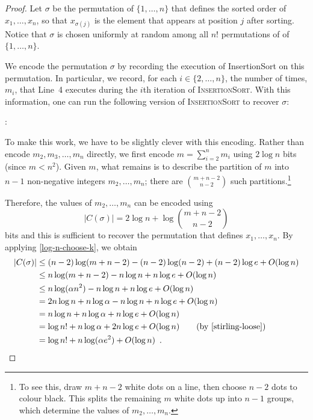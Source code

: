 \documentclass{patmorin}
\begin{document}
\begin{proof}
  Let $\sigma$ be the permutation of $\{1,\ldots,n\}$ that defines the
  sorted order of $x_1,\ldots,x_n$, so that $x_{\sigma(j)}$ is the
  element that appears at position $j$ after sorting. Notice that
  $\sigma$ is chosen uniformly at random among all $n!$ permutations
  of of $\{1,\ldots,n\}$.
  
  We encode the permutation $\sigma$ by recording the execution of
  InsertionSort on this permutation. In particular, we record, for
  each $i\in\{2,\ldots,n\}$, the number of times, $m_i$, that Line~4
  executes during the $i$th iteration of \textsc{InsertionSort}. With
  this information, one can run the following version of
  \textsc{InsertionSort} to recover $\sigma$:
  
  :
  \begin{algorithmic}[1]
       \ENDFOR
    \ENDFOR
  \end{algorithmic}
   
  To make this work, we have to be slightly clever with this
  encoding. Rather than encode $m_2,m_3,\ldots,m_n$ directly, we first
  encode $m=\sum_{i=2}^{n} m_i$ using $2\log n$ bits (since
  $m < n^2$). Given $m$, what remains is to describe the partition of
  $m$ into $n-1$ non-negative integers $m_2,\ldots,m_n$; there are
  $\binom{m+n-2}{n-2}$ such partitions.\footnote{To see this, draw
    $m+n-2$ white dots on a line, then choose $n-2$ dots to colour
    black. This splits the remaining $m$ white dots up into $n-1$
    groups, which determine the values of $m_2,\ldots,m_n$.}
  
  Therefore, the values of $m_2,\ldots,m_n$ can be encoded using
  \[
    |C(\sigma)| = 2\log n + \log\binom{m+n-2}{n-2}
  \]
  bits and this is sufficient to recover the permutation that defines
  $x_1,\ldots,x_n$.  By applying \eqref{log-n-choose-k}, we obtain
  \begin{align*}
    |C(\sigma)| & \le (n-2)\log(m+n-2) - (n-2)\log(n-2)  + (n-2)\log e + O(\log n) \\
      & \le n\log(m+n-2) - n\log n   + n\log e + O(\log n) \\
      & \le n\log(\alpha n^2) - n\log n  + n\log e + O(\log n) \\
      & = 2n\log n + n\log\alpha - n\log n  + n\log e + O(\log n) \\
      & = n\log n + n\log\alpha + n\log e + O(\log n) \\
      & = \log n! + n\log\alpha + 2n\log e + O(\log n) \tag{by \eqref{stirling-loose}} \\
      & = \log n! + n \log (\alpha e^2) + O(\log n) \enspace .  \qedhere
  \end{align*}
\end{proof}
\end{document}
